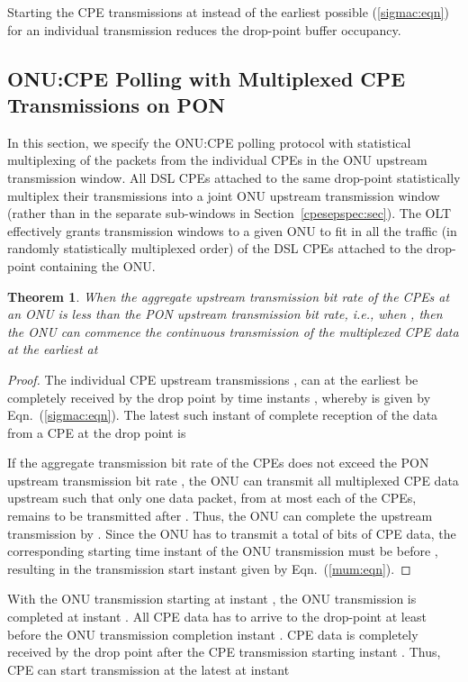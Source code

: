 \documentclass[pdftex,journal]{IEEEtran}
\newtheorem{theorem}{Theorem}
\begin{document}
Starting the CPE transmissions at  instead of
the earliest possible  (\ref{sigmac:eqn})
for an individual transmission reduces the drop-point buffer occupancy.

\subsection{ONU:CPE Polling with Multiplexed CPE Transmissions on PON}
\label{onucpemux:sec}
In this section, we specify the ONU:CPE polling protocol with statistical
multiplexing of the packets from the individual CPEs
in the ONU upstream transmission window.
All DSL CPEs attached to the same drop-point statistically multiplex their
transmissions into a joint ONU upstream transmission window
(rather than in the separate sub-windows in Section~\ref{cpesepspec:sec}).
The OLT effectively grants transmission
windows to a given ONU to fit in all the traffic (in randomly
statistically multiplexed order) of the DSL CPEs attached to the
drop-point containing the ONU.

\begin{theorem}
When the aggregate upstream transmission bit rate of the  CPEs at
an ONU is less than the PON upstream transmission bit rate, i.e.,
when , then the ONU can commence the continuous
transmission of the multiplexed CPE data at the earliest at

\end{theorem}

\begin{proof}
The individual CPE upstream transmissions ,
can at the earliest be completely received by the drop point by time
instants , whereby  is given
by Eqn.~(\ref{sigmac:eqn}).
The latest such instant of complete reception of the data from a CPE at
the drop point is

If the aggregate transmission bit rate  of the  CPEs does not
exceed the PON upstream transmission bit rate ,
the ONU can transmit all multiplexed CPE data upstream such that only
one data packet,
from at most each of the  CPEs,
remains to be transmitted after .
Thus, the ONU can complete the upstream transmission by
.
Since the ONU has to transmit a total of  bits of CPE data,
the corresponding starting time instant of the ONU transmission must be
 before ,
resulting in the transmission start instant given by Eqn.~(\ref{mum:eqn}).
\end{proof}

With the ONU transmission starting at instant ,
the ONU transmission is completed at instant
.
All CPE data has to arrive to the drop-point at least
 before the ONU transmission
completion instant .
CPE  data is completely received by the drop point
 after the CPE transmission
starting instant .
Thus, CPE  can start transmission at the latest at instant
\end{document}
